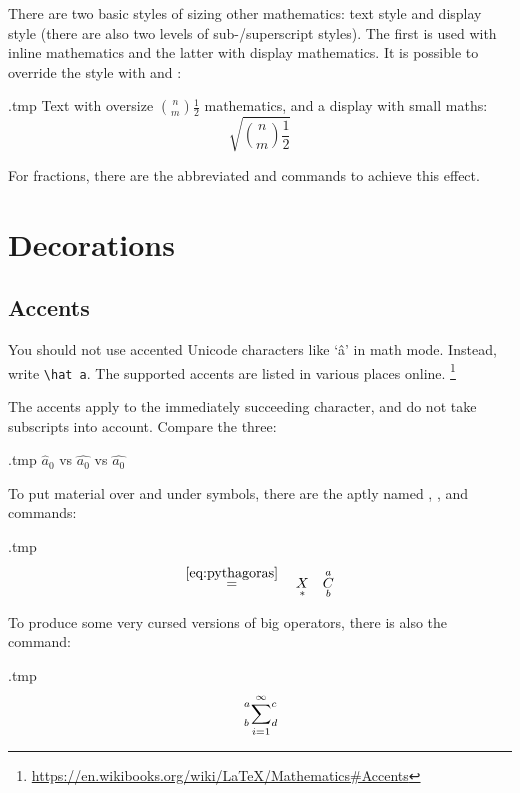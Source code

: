 There are two basic styles of sizing other mathematics: text style and display style
(there are also two levels of sub-/superscript styles).
The first is used with inline mathematics and the latter with display mathematics.
It is possible to override the style with  and :
%
\begin{VerbatimOut}{\jobname.tmp}
Text with oversize
$\displaystyle \binom n m \frac 1 2$
mathematics, and a display with small maths:
\[
\sqrt{\textstyle \binom n m \frac 1 2}
\]
\end{VerbatimOut}
\ShowExample
%
For fractions, there are the abbreviated  and  commands
to achieve this effect.


%
%
%
\section{Decorations}

\subsection{Accents}

You should not use accented Unicode characters like `â' in math mode.
Instead, write \verb|\hat a|.
The supported accents are listed in various places online.%
\footnote{\url{https://en.wikibooks.org/wiki/LaTeX/Mathematics\#Accents}}

\begin{gotcha}
The accents apply to the immediately succeeding character,
and do not take subscripts into account.
Compare the three:
%
\begin{VerbatimOut}{\jobname.tmp}
$\hat a_0$ vs $\hat {a_0}$
vs $\widehat {a_0}$
\end{VerbatimOut}
\ShowExample
\end{gotcha}

To put material over and under symbols,
there are the aptly named , , and  commands:
%
\begin{VerbatimOut}{\jobname.tmp}
\[
\overset{\eqref{eq:pythagoras}}{=}
\quad \underset{\ast}{X}
\quad \overunderset{a}{b}{C}
\]
\end{VerbatimOut}
\ShowExample
%
To produce some very cursed versions of big operators,
there is also the  command:
%
\begin{VerbatimOut}{\jobname.tmp}
\[
\sideset{^a_b}{^c_d}\sum_{i=1}^\infty
\]
\end{VerbatimOut}
\ShowExample



